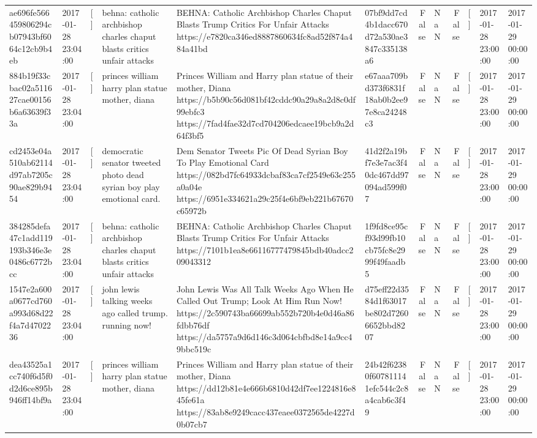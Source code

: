 \begin{tabular}{llllllrlrlll}
ae696fe566459806294cb07943bf6064c12cb9b4eb & 2017-01-28 23:04:00 & [] & behna: catholic archbishop charles chaput blasts critics unfair attacks & BEHNA: Catholic Archbishop Charles Chaput Blasts Trump Critics For Unfair Attacks https://e7820ca346ed8887860634fc8ad52f874a484a41bd & 07bf9dd7cd4b1dacc670d72a530ae3847c335138a6 & False & NaN & False & [] & 2017-01-28 23:00:00 & 2017-01-29 00:00:00 \\
884b19f33cbac02a511627cae00156b6a63639f33a & 2017-01-28 23:04:00 & [] & princes william harry plan statue mother, diana & Princes William and Harry plan statue of their mother, Diana https://b5b90c56d081bf42cddc90a29a8a2d8c0df99ebfc3 https://7fad4fae32d7cd704206edcaee19bcb9a2d64f3bf5 & e67aaa709bd373f6831f18ab0b2ee97e8ca24248c3 & False & NaN & False & [] & 2017-01-28 23:00:00 & 2017-01-29 00:00:00 \\
cd2453e04a510ab62114d97ab7205c90ae829b9454 & 2017-01-28 23:04:00 & [] & democratic senator tweeted photo dead syrian boy play emotional card. & Dem Senator Tweets Pic Of Dead Syrian Boy To Play Emotional Card https://082bd7fc64933dcbaf83ca7cf2549e63c255a0a04e https://6951e334621a29c25f4e6bf9eb221b67670c65972b & 41d2f2a19bf7e3e7ac3f40dc467dd97094ad599f07 & False & NaN & False & [] & 2017-01-28 23:00:00 & 2017-01-29 00:00:00 \\
384285defa47c1add119193b346e3e0486c6772bcc & 2017-01-28 23:04:00 & [] & behna: catholic archbishop charles chaput blasts critics unfair attacks & BEHNA: Catholic Archbishop Charles Chaput Blasts Trump Critics For Unfair Attacks https://7101b1ea8e66116777479845bdb40adcc209043312 & 1f9fd8ce95cf93d99fb10cb75fc8e2999f49faadb5 & False & NaN & False & [] & 2017-01-28 23:00:00 & 2017-01-29 00:00:00 \\
1547e2a600a0677cd760a993d68d22f4a7d4702236 & 2017-01-28 23:04:00 & [] & john lewis talking weeks ago called trump. running now! & John Lewis Was All Talk Weeks Ago When He Called Out Trump; Look At Him Run Now! https://2c590743ba66699ab552b720b4e0d46a86fdbb76df https://da5757a9d6d146c3d064cbfbd8e14a9cc49bbc519c & d75eff22d3584d1f63017be802d72606652bbd8207 & False & NaN & False & [] & 2017-01-28 23:00:00 & 2017-01-29 00:00:00 \\
dea43525a1cc740f6d5f0d2d6ce895b946ff14bf9a & 2017-01-28 23:04:00 & [] & princes william harry plan statue mother, diana & Princes William and Harry plan statue of their mother, Diana https://dd12b81e4e666b6810d42df7ee1224816e845fe61a https://83ab8e9249cacc437eaee0372565de4227d0b07cb7 & 24b42f62380f607811141efc544c2c8a4cab6c3f49 & False & NaN & False & [] & 2017-01-28 23:00:00 & 2017-01-29 00:00:00 \\

\end{tabular}
